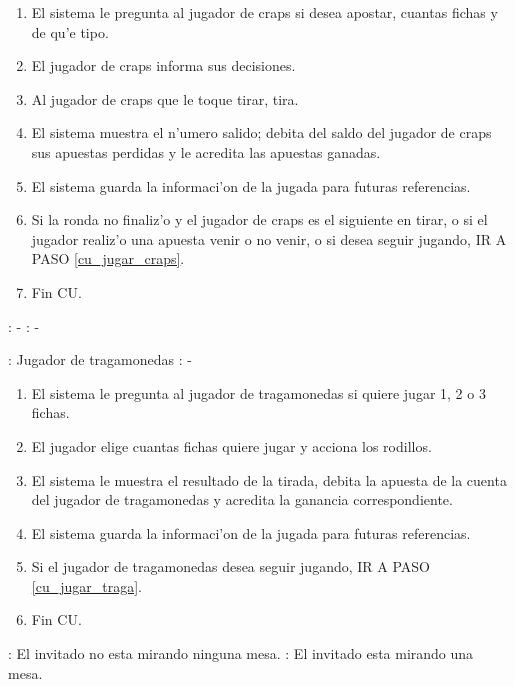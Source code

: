\begin{enumerate}
\item El sistema le pregunta al jugador de craps si desea apostar, cuantas fichas y de qu'e tipo. \label{cu_jugar_craps}
\item El jugador de craps informa sus decisiones.
\item Al jugador de craps que le toque tirar, tira.
\item El sistema muestra el n'umero salido; debita del saldo del jugador de craps sus apuestas perdidas y le acredita las apuestas ganadas.
\item El sistema guarda la informaci'on de la jugada para futuras referencias.
\item Si la ronda no finaliz'o y el jugador de craps es el siguiente en tirar, o si el jugador realiz'o una apuesta venir o no venir, o si desea seguir jugando, IR A PASO \ref{cu_jugar_craps}.
\item Fin CU.
\end{enumerate}



: - \newline
\indent{}: -

: Jugador de tragamonedas \newline
\indent{}: -

\begin{enumerate}
\item El sistema le pregunta al jugador de tragamonedas si quiere jugar 1, 2 o 3 fichas. \label{cu_jugar_traga}
\item El jugador elige cuantas fichas quiere jugar y acciona los rodillos.
\item El sistema le muestra el resultado de la tirada, debita la apuesta de la cuenta del jugador de tragamonedas y acredita la ganancia correspondiente.
\item El sistema guarda la informaci'on de la jugada para futuras referencias.
\item Si el jugador de tragamonedas desea seguir jugando, IR A PASO \ref{cu_jugar_traga}.
\item Fin CU.
\end{enumerate}




: El invitado no esta mirando ninguna mesa. \newline
\indent{}: El invitado esta mirando una mesa.

